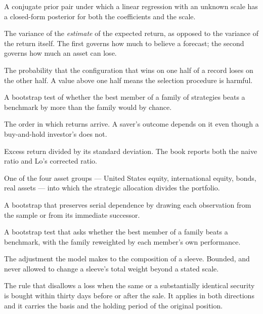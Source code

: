 \begin{description}[style=nextline,leftmargin=1.1em,labelindent=0pt,
  font=\normalfont\ttfamily\color{accent},itemsep=3pt,parsep=0pt]
\item[Normal inverse-gamma] A conjugate prior pair under which a linear
regression with an unknown scale has a closed-form posterior for both the
coefficients and the scale.

\item[Posterior variance of the mean] The variance of the \emph{estimate}
of the expected return, as opposed to the variance of the return itself.
The first governs how much to believe a forecast; the second governs how
much an asset can lose.

\item[Probability of backtest overfitting] The probability that the
configuration that wins on one half of a record loses on the other half.
A value above one half means the selection procedure is harmful.

\item[Reality check] A bootstrap test of whether the best member of a
family of strategies beats a benchmark by more than the family would by
chance.

\item[Sequence of returns] The order in which returns arrive. A saver's
outcome depends on it even though a buy-and-hold investor's does not.

\item[Sharpe ratio] Excess return divided by its standard deviation. The
book reports both the naive ratio and Lo's corrected ratio.

\item[Sleeve] One of the four asset groups --- United States equity,
international equity, bonds, real assets --- into which the strategic
allocation divides the portfolio.

\item[Stationary bootstrap] A bootstrap that preserves serial dependence
by drawing each observation from the sample or from its immediate
successor.

\item[Superior predictive ability] A bootstrap test that asks whether the
best member of a family beats a benchmark, with the family reweighted by
each member's own performance.

\item[Tilt] The adjustment the model makes to the composition of a sleeve.
Bounded, and never allowed to change a sleeve's total weight beyond a
stated scale.

\item[Wash sale] The rule that disallows a loss when the same or a
substantially identical security is bought within thirty days before or
after the sale. It applies in both directions and it carries the basis
and the holding period of the original position.

\end{description}
\clearpage

